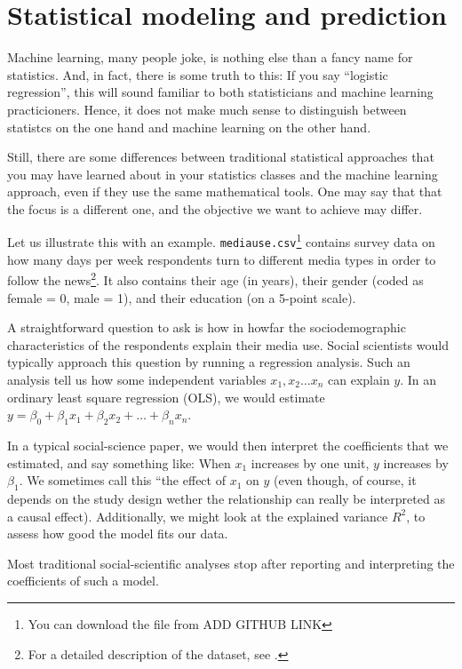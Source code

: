 \section{Statistical modeling and prediction}
\label{sec:prediction}
Machine learning, many people joke, is nothing else than a fancy name for statistics.
And, in fact, there is some truth to this:
If you say ``logistic regression'', this will sound familiar to both statisticians
and machine learning practicioners.
Hence, it does not make much sense to distinguish between statistcs on the one hand
and machine learning on the other hand.

Still, there are some differences between traditional statistical approaches that
you may have learned about in your statistics classes and the machine learning
approach, even if they use the same mathematical tools. One may say that that the
focus is a different one, and the objective we want to achieve may differ.

Let us illustrate this with an example.
\texttt{mediause.csv}\footnote{You can download the file from ADD GITHUB LINK}
contains survey data on how many days per week respondents turn to different media
types in order to follow the news\footnote{For a detailed description of the
dataset, see \citet{Trilling2013phd}.}. It also contains their
age (in years), their gender (coded as female = 0, male = 1), and their education
(on a 5-point scale).

A straightforward question to ask is how in howfar the sociodemographic
characteristics of the respondents explain their media use.
Social scientists would typically approach this question by running a regression
analysis.
Such an analysis tell us how some independent variables $x_1, x_2 \ldots x_n$
can explain $y$.
In an ordinary least square regression (OLS), we would estimate
$y=\beta_0 + \beta_1 x_1 + \beta_2 x_2 + \ldots + \beta_n x_n$.

In a typical social-science paper, we would then interpret the coefficients
that we estimated, and say something like: When $x_1$ increases by one unit,
$y$ increases by $\beta_1$.
We sometimes call this ``the effect of $x_1$ on $y$ (even though, of course,
it depends on the study design wether the relationship can really be interpreted
as a causal effect).
Additionally, we might look at the explained variance $R^2$, to assess how good
the model fits our data.


Most traditional social-scientific analyses stop after reporting and interpreting
the coefficients of such a model.

